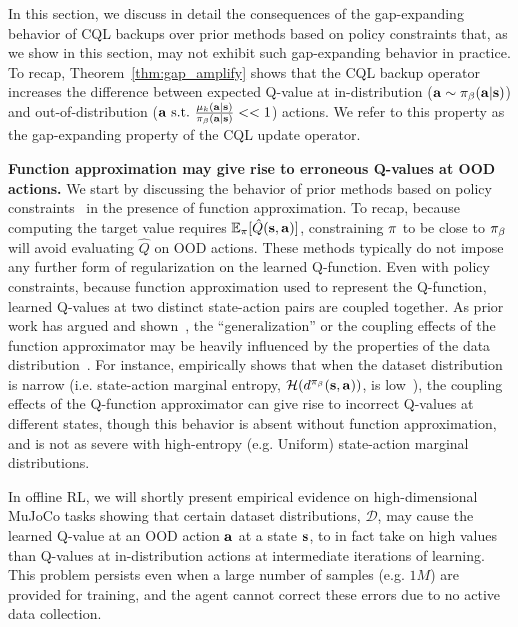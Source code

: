 
In this section, we discuss in detail the consequences of the gap-expanding behavior of CQL backups over prior methods based on policy constraints that, as we show in this section, may not exhibit such gap-expanding behavior in practice. To recap, Theorem~\ref{thm:gap_amplify} shows that the CQL backup operator increases the difference between expected Q-value at in-distribution ($\mathbf{a} \sim {\pi_\beta}(\mathbf{a}|\mathbf{s})$) and out-of-distribution ($\mathbf{a} \text{~s.t.~} \frac{\mu_k(\mathbf{a}|\mathbf{s})}{{\pi_\beta}(\mathbf{a}|\mathbf{s})} << 1$) actions. We refer to this property as the gap-expanding property of the CQL update operator.



\textbf{Function approximation may give rise to erroneous Q-values at OOD actions.} We start by discussing the behavior of prior methods based on policy constraints~\citep{kumar2019stabilizing,fujimoto2018off,jaques2019way,wu2019behavior} in the presence of function approximation.
To recap, because computing the target value requires $\mathbb{E}_\pi[\hat{Q}(\mathbf{s},\mathbf{a})]$, constraining $\pi$ to be close to ${\pi_\beta}$ will avoid evaluating $\hat{Q}$ on OOD actions. These methods typically do not impose any further form of regularization on the learned Q-function.
Even with policy constraints, because function approximation used to represent the Q-function, learned Q-values at two distinct state-action pairs are coupled together. As prior work has argued and shown~\citep{achiam2019towards,fu2019diagnosing,kumar2020discor}, the ``generalization'' or the coupling effects of the function approximator may be heavily influenced by the properties of the data distribution~\citep{fu2019diagnosing,kumar2020discor}. For instance, \citet{fu2019diagnosing} empirically shows that when the dataset distribution is narrow (i.e. state-action marginal entropy, $\mathcal{H}(d^{\pi_\beta}(\mathbf{s}, \mathbf{a}))$, is low~\citep{fu2019diagnosing}), the coupling effects of the Q-function approximator can give rise to incorrect Q-values at different states, though this behavior is absent without function approximation, and is not as severe with high-entropy (e.g. Uniform) state-action marginal distributions.

In offline RL, we will shortly present empirical evidence on high-dimensional MuJoCo tasks showing that certain dataset distributions, $\mathcal{D}$, may cause the learned Q-value at an OOD action $\mathbf{a}$ at a state $\mathbf{s}$, to in fact take on high values than Q-values at in-distribution actions at intermediate iterations of learning. This problem persists even when a large number of samples (e.g. $1M$) are provided for training, and the agent cannot correct these errors due to no active data collection.  


